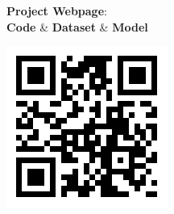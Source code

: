 {\begin{minipage}[t]{0.4\textwidth}
        \begin{center}
        \begin{minipage}{0.56\linewidth}
            \begin{center}
            \textbf{Project Webpage}: \\
            \vspace{0.5em}\textbf{Code} \& \textbf{Dataset} \& \textbf{Model}
            \end{center}
        \end{minipage}
        \begin{minipage}{0.24\linewidth}
            \begin{center}
                \includegraphics[width=\linewidth]{images/PS-FCN_QRCode.png}
            \end{center}
        \end{minipage}
        \end{center}
    \end{minipage}
}